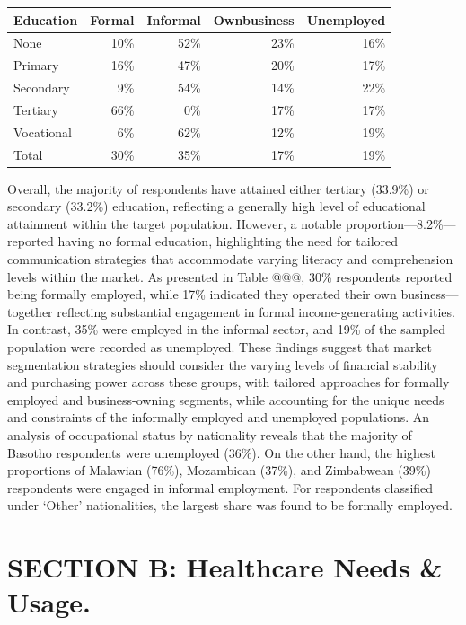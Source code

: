 \documentclass[
  letterpaper,
  DIV=11,
  numbers=noendperiod]{scrartcl}
\begin{document}
\begin{table}
\fontsize{12.0pt}{14.4pt}\selectfont
\begin{tabular*}{\linewidth}{@{\extracolsep{\fill}}lrrrr}
\toprule
Education & Formal & Informal & Ownbusiness & Unemployed \\ 
\midrule\addlinespace[2.5pt]
None & 10\% & 52\% & 23\% & 16\% \\ 
Primary & 16\% & 47\% & 20\% & 17\% \\ 
Secondary & 9\% & 54\% & 14\% & 22\% \\ 
Tertiary & 66\% & 0\% & 17\% & 17\% \\ 
Vocational & 6\% & 62\% & 12\% & 19\% \\ 
Total & 30\% & 35\% & 17\% & 19\% \\ 
\bottomrule
\end{tabular*}
\end{table}

Overall, the majority of respondents have attained either tertiary
(33.9\%) or secondary (33.2\%) education, reflecting a generally high
level of educational attainment within the target population. However, a
notable proportion---8.2\%---reported having no formal education,
highlighting the need for tailored communication strategies that
accommodate varying literacy and comprehension levels within the market.
As presented in Table @@@, 30\% respondents reported being formally
employed, while 17\% indicated they operated their own
business---together reflecting substantial engagement in formal
income-generating activities. In contrast, 35\% were employed in the
informal sector, and 19\% of the sampled population were recorded as
unemployed. These findings suggest that market segmentation strategies
should consider the varying levels of financial stability and purchasing
power across these groups, with tailored approaches for formally
employed and business-owning segments, while accounting for the unique
needs and constraints of the informally employed and unemployed
populations. An analysis of occupational status by nationality reveals
that the majority of Basotho respondents were unemployed (36\%). On the
other hand, the highest proportions of Malawian (76\%), Mozambican
(37\%), and Zimbabwean (39\%) respondents were engaged in informal
employment. For respondents classified under `Other' nationalities, the
largest share was found to be formally employed.

\section{SECTION B: Healthcare Needs \&
Usage.}\label{section-b-healthcare-needs-usage.}
\end{document}
